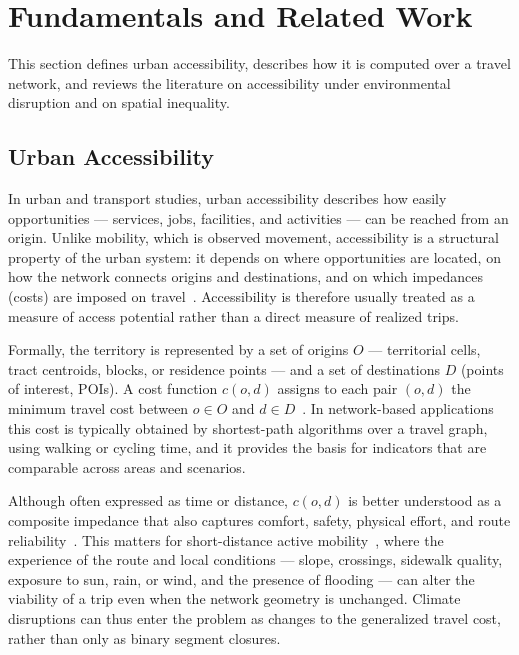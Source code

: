 \section{Fundamentals and Related Work}
\label{sec:fundamentals}

This section defines urban accessibility, describes how it is computed over a travel network, and reviews the literature on accessibility under environmental disruption and on spatial inequality.

\subsection{Urban Accessibility}

In urban and transport studies, urban accessibility describes how easily opportunities — services, jobs, facilities, and activities — can be reached from an origin. Unlike mobility, which is observed movement, accessibility is a structural property of the urban system: it depends on where opportunities are located, on how the network connects origins and destinations, and on which impedances (costs) are imposed on travel~\cite{Handy1997Measuring}. Accessibility is therefore usually treated as a measure of access potential rather than a direct measure of realized trips.

Formally, the territory is represented by a set of origins $O$ — territorial cells, tract centroids, blocks, or residence points — and a set of destinations $D$ (points of interest, POIs). A cost function $c(o,d)$ assigns to each pair $(o,d)$ the minimum travel cost between $o \in O$ and $d \in D$~\cite{Miller1999Measuring}. In network-based applications this cost is typically obtained by shortest-path algorithms over a travel graph, using walking or cycling time, and it provides the basis for indicators that are comparable across areas and scenarios.

Although often expressed as time or distance, $c(o,d)$ is better understood as a composite impedance that also captures comfort, safety, physical effort, and route reliability~\cite{Puello2016Integration}. This matters for short-distance active mobility~\cite{Cook2022More}, where the experience of the route and local conditions — slope, crossings, sidewalk quality, exposure to sun, rain, or wind, and the presence of flooding — can alter the viability of a trip even when the network geometry is unchanged. Climate disruptions can thus enter the problem as changes to the generalized travel cost, rather than only as binary segment closures.

